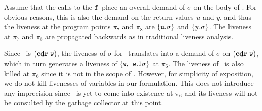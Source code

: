 \documentclass{sig-alternate}
\begin{document}
Assume that the calls to the $\mbox{\tt f}$ place an overall demand of $\sigma$
on the body  of \pf.  For obvious reasons, this is  also the demand on
the return  values $u$ and $y$,  and thus the liveness  at the program
points  $\pi_7$  and  $\pi_8$  are $\lbrace  \mbox{\tt u}.\sigma  \rbrace$  and
$\{\mbox{\tt y}.\sigma\}$.  The liveness at  $\pi_7$ and $\pi_8$ are propagated
backwards as in traditional liveness analysis.

Since   \pu\  is  $(\mbox{$\mathbf{cdr}$}~   \mbox{\tt w})$,  the   liveness  of   $\sigma$  for
\pu\ translates  into a demand  of $\sigma$ on $(\mbox{$\mathbf{cdr}$}~\mbox{\tt w})$,  which in
turn generates  a liveness  of $\{\mbox{\tt w},~\mbox{\tt w}.1\sigma\}$ at  $\pi_6$. The
liveness of  \pu\ is  also killed at  $\pi_6$ since  it is not  in the
scope of  \pu. However, for simplicity  of exposition, we  do not kill
  livenesses  of  variables  in  our formulation.   This  does  not
introduce any imprecision since \pu\  is yet to come into existence at
$\pi_6$  and  its  liveness  will  not be  consulted  by  the  garbage
collector at this point.
\end{document}

